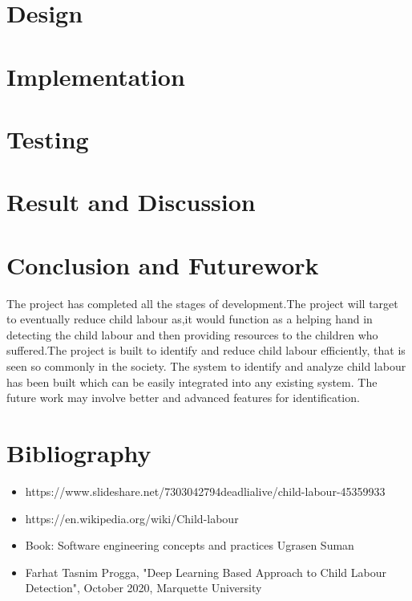 \documentclass{SSBT-BE}
\begin{document}
\chapter{Design}


\chapter{Implementation}


\chapter{Testing}


\chapter{Result and Discussion}




\chapter{Conclusion and Futurework}
The project has completed all the stages of development.The project will target to eventually reduce child labour as,it would function as a helping hand in detecting the child labour and then providing resources to the children who suffered.The project is built to identify and reduce child labour  efficiently, that is seen so commonly in the society.
The system to identify and analyze child labour has been built which can be easily integrated into
any existing system.
The future work may involve better and advanced features for identification.

\chapter{Bibliography}
\begin{itemize}
    \item https://www.slideshare.net/7303042794deadlialive/child-labour-45359933

\item https://en.wikipedia.org/wiki/Child-labour

\item Book: Software engineering concepts and practices Ugrasen Suman

\item Farhat Tasnim Progga, "Deep Learning Based Approach to Child Labour Detection", October 2020, Marquette University
\end{itemize}


\newpage
{}
\printindex
\end{document}

